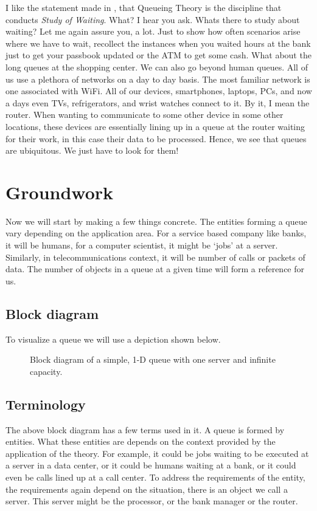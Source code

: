 \documentclass[11pt, a4paper]{report}
\begin{document}
I like the statement made in \cite{RobertazziQ}, that Queueing Theory is the discipline that conducts \emph{Study of Waiting}. What? I hear you ask. Whats there to study about waiting? Let me again assure you, a lot. Just to show how often scenarios arise where we have to wait, recollect the instances when you waited hours at the bank just to get your passbook updated or the ATM to get some cash. What about the long queues at the shopping center. We can also go beyond human queues. All of us use a plethora of networks on a day to day basis. The most familiar network is one associated with WiFi. All of our devices, smartphones, laptops, PCs, and now a days even TVs, refrigerators, and wrist watches connect to it. By it, I mean the router. When wanting to communicate to some other device in some other locations, these devices are essentially lining up in a queue at the router waiting for their work, in this case their data to be processed. Hence, we see that queues are ubiquitous. We just have to look for them!  

\section{Groundwork}
Now we will start by making a few things concrete. The entities forming a queue vary depending on the application area. For a service based company like banks, it will be humans, for a computer scientist, it might be   `jobs' at a server. Similarly, in telecommunications context, it will be number of calls or packets of data. The number of objects in a queue at a given time will form a reference for us. 

\subsection{Block diagram}
To visualize a queue we will use a depiction shown below.
    \begin{figure}
        \centering
        
        \label{fig:simpleQblk}
        \caption{Block diagram of a simple, 1-D queue with one server and infinite capacity.}
    \end{figure}

\subsection{Terminology}
The above block diagram has a few terms used in it. A queue is formed by entities. What these entities are depends on the context provided by the application of the theory. For example, it could be jobs waiting to be executed at a server in a data center, or it could be humans waiting at a bank, or it could even be calls lined up at a call center. To address the requirements of the entity, the requirements again depend on the situation, there is an object we call a server. This server might be the processor, or the bank manager or the router.
\end{document}
